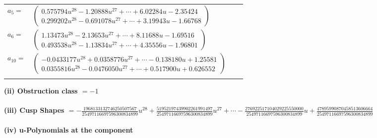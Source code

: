 \documentclass[1p]{elsarticle_modified}
\theoremstyle{definition}
\begin{document}
\begin{tabular}{m{7pt} m{180pt} m{7pt} m{180pt} }
\flushright $a_{5}=$&$\begin{pmatrix}0.575794 u^{28}-1.20888 u^{27}+\cdots+6.02284 u-2.35424\\0.299202 u^{28}-0.691078 u^{27}+\cdots+3.19943 u-1.66768\end{pmatrix}$ \\
\flushright $a_{6}=$&$\begin{pmatrix}1.13473 u^{28}-2.13653 u^{27}+\cdots+8.11688 u-1.69516\\0.493538 u^{28}-1.13834 u^{27}+\cdots+4.35556 u-1.96801\end{pmatrix}$ \\
\flushright $a_{10}=$&$\begin{pmatrix}-0.0433177 u^{28}+0.0358776 u^{27}+\cdots-0.138180 u+1.25581\\0.0355816 u^{28}-0.0476050 u^{27}+\cdots+0.517900 u+0.626552\end{pmatrix}$\\&\end{tabular}
\flushleft \textbf{(ii) Obstruction class $= -1$}\\~\\
\flushleft \textbf{(iii) Cusp Shapes $= -\frac{1968133132746250507567}{25497116697596300834899} u^{28}+\frac{51952197439902261991497}{25497116697596300834899} u^{27}+\cdots-\frac{276922517104029225550000}{25497116697596300834899} u+\frac{47895990870458513606664}{25497116697596300834899}$}\\~\\
\newpage\renewcommand{\arraystretch}{1}
\flushleft \textbf{(iv) u-Polynomials at the component}\newline \\
\end{document}
